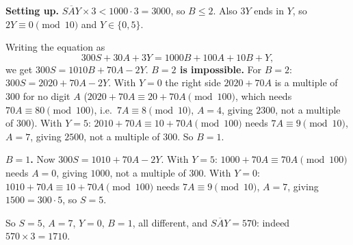 \textbf{Setting up.} $\overline{SAY}\times3<1000\cdot3=3000$, so $B\le2$. Also $3Y$ ends in $Y$, so $2Y\equiv0\pmod{10}$ and $Y\in\{0,5\}$.

Writing the equation as
\[
300S+30A+3Y=1000B+100A+10B+Y,
\]
we get $300S=1010B+70A-2Y$. \textbf{$B=2$ is impossible.} For $B=2$: $300S=2020+70A-2Y$. With $Y=0$ the right side $2020+70A$ is a multiple of $300$ for no digit $A$ ($2020+70A\equiv20+70A\pmod{100}$, which needs $70A\equiv80\pmod{100}$, i.e.\ $7A\equiv8\pmod{10}$, $A=4$, giving $2300$, not a multiple of $300$). With $Y=5$: $2010+70A\equiv10+70A\pmod{100}$ needs $7A\equiv9\pmod{10}$, $A=7$, giving $2500$, not a multiple of $300$. So $B=1$.

\textbf{$B=1$.} Now $300S=1010+70A-2Y$. With $Y=5$: $1000+70A\equiv70A\pmod{100}$ needs $A=0$, giving $1000$, not a multiple of $300$. With $Y=0$: $1010+70A\equiv10+70A\pmod{100}$ needs $7A\equiv9\pmod{10}$, $A=7$, giving $1500=300\cdot5$, so $S=5$.

So $S=5$, $A=7$, $Y=0$, $B=1$, all different, and $\overline{SAY}=\boxed{570}$: indeed $570\times3=1710$.

